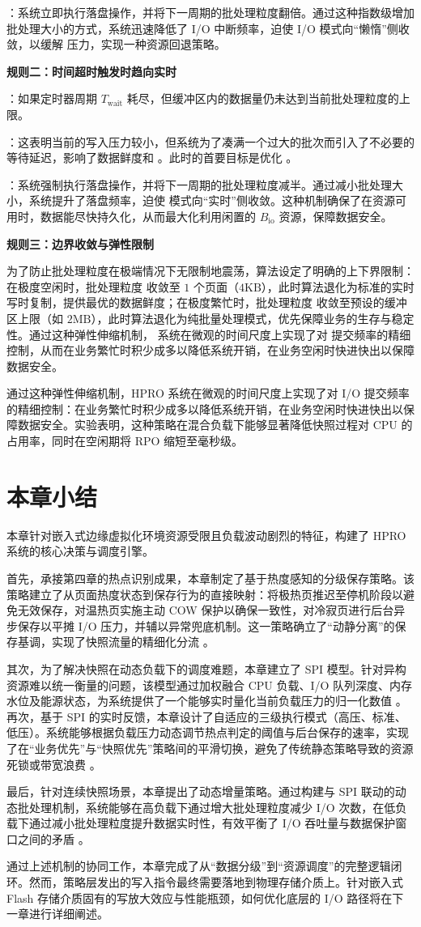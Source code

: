 ：系统立即执行落盘操作，并将下一周期的批处理粒度翻倍。通过这种指数级增加批处理大小的方式，系统迅速降低了 I/O 中断频率，迫使 I/O 模式向“懒惰”侧收敛，以缓解  压力，实现一种资源回退策略。

\textbf{规则二：时间超时触发时趋向实时}

：如果定时器周期 $T_{\text{wait}}$ 耗尽，但缓冲区内的数据量仍未达到当前批处理粒度的上限。

：这表明当前的写入压力较小，但系统为了凑满一个过大的批次而引入了不必要的等待延迟，影响了数据鲜度和 。此时的首要目标是优化 。

：系统强制执行落盘操作，并将下一周期的批处理粒度减半。通过减小批处理大小，系统提升了落盘频率，迫使  模式向“实时”侧收敛。这种机制确保了在资源可用时，数据能尽快持久化，从而最大化利用闲置的 $B_{\text{io}}$ 资源，保障数据安全。

\textbf{规则三：边界收敛与弹性限制}

为了防止批处理粒度在极端情况下无限制地震荡，算法设定了明确的上下界限制：在极度空闲时，批处理粒度 收敛至 $1$ 个页面（$4\text{KB}$），此时算法退化为标准的实时写时复制，提供最优的数据鲜度；在极度繁忙时，批处理粒度 收敛至预设的缓冲区上限（如 $2\text{MB}$），此时算法退化为纯批量处理模式，优先保障业务的生存与稳定性。通过这种弹性伸缩机制， 系统在微观的时间尺度上实现了对  提交频率的精细控制，从而在业务繁忙时积少成多以降低系统开销，在业务空闲时快进快出以保障数据安全。

通过这种弹性伸缩机制，HPRO 系统在微观的时间尺度上实现了对 I/O 提交频率的精细控制：在业务繁忙时积少成多以降低系统开销，在业务空闲时快进快出以保障数据安全。实验表明，这种策略在混合负载下能够显著降低快照过程对 CPU 的占用率，同时在空闲期将 RPO 缩短至毫秒级。

\section{本章小结}

本章针对嵌入式边缘虚拟化环境资源受限且负载波动剧烈的特征，构建了 HPRO 系统的核心决策与调度引擎。

首先，承接第四章的热点识别成果，本章制定了基于热度感知的分级保存策略。该策略建立了从页面热度状态到保存行为的直接映射：将极热页推迟至停机阶段以避免无效保存，对温热页实施主动 COW 保护以确保一致性，对冷寂页进行后台异步保存以平摊 I/O 压力，并辅以异常兜底机制。这一策略确立了“动静分离”的保存基调，实现了快照流量的精细化分流 。

其次，为了解决快照在动态负载下的调度难题，本章建立了 SPI 模型。针对异构资源难以统一衡量的问题，该模型通过加权融合 CPU 负载、I/O 队列深度、内存水位及能源状态，为系统提供了一个能够实时量化当前负载压力的归一化数值 。
再次，基于 SPI 的实时反馈，本章设计了自适应的三级执行模式（高压、标准、低压）。系统能够根据负载压力动态调节热点判定的阈值与后台保存的速率，实现了在“业务优先”与“快照优先”策略间的平滑切换，避免了传统静态策略导致的资源死锁或带宽浪费 。

最后，针对连续快照场景，本章提出了动态增量策略。通过构建与 SPI 联动的动态批处理机制，系统能够在高负载下通过增大批处理粒度减少 I/O 次数，在低负载下通过减小批处理粒度提升数据实时性，有效平衡了 I/O 吞吐量与数据保护窗口之间的矛盾 。

通过上述机制的协同工作，本章完成了从“数据分级”到“资源调度”的完整逻辑闭环。然而，策略层发出的写入指令最终需要落地到物理存储介质上。针对嵌入式 Flash 存储介质固有的写放大效应与性能瓶颈，如何优化底层的 I/O 路径将在下一章进行详细阐述。

